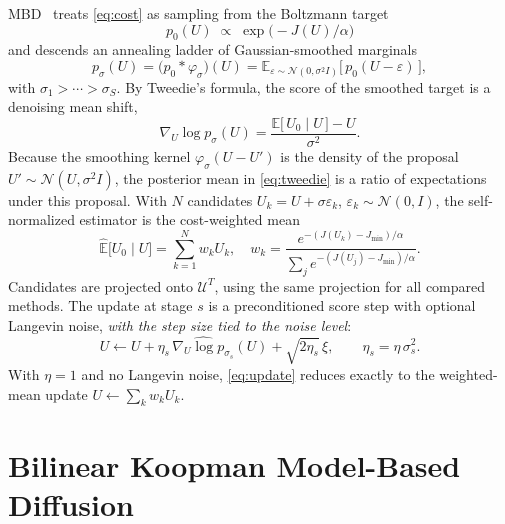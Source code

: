 \documentclass[letterpaper,10pt,conference]{ieeeconf}
\begin{document}
MBD~\cite{pan2024model} treats \eqref{eq:cost} as sampling from the Boltzmann target
\begin{equation}
p_0(U) \;\propto\; \exp\!\big(-J(U)/\alpha\big)
\label{eq:target}
\end{equation}
and descends an annealing ladder of Gaussian-smoothed marginals
\begin{equation}
p_{\sigma}(U) = \big(p_0 * \varphi_{\sigma}\big)(U)
= \mathbb{E}_{\varepsilon \sim \mathcal{N}(0, \sigma^{2} I)}
\big[\, p_0(U - \varepsilon) \,\big],
\label{eq:smooth}
\end{equation}
with $\sigma_1 > \cdots > \sigma_S$.
By Tweedie's formula, the score of the smoothed target is a denoising mean shift,
\begin{equation}
\nabla_U \log p_{\sigma}(U)
= \frac{\mathbb{E}\big[\,U_0 \mid U\,\big] - U}{\sigma^{2}} .
\label{eq:tweedie}
\end{equation}
Because the smoothing kernel $\varphi_\sigma(U-U')$ is the density of the proposal $U' \sim \mathcal{N}(U,\sigma^2 I)$, the posterior mean in \eqref{eq:tweedie} is a ratio of expectations under this proposal. With $N$ candidates $U_k=U+\sigma\varepsilon_k$, $\varepsilon_k\sim\mathcal{N}(0,I)$, the self-normalized estimator is the cost-weighted mean
\begin{equation}
\widehat{\mathbb{E}}\big[U_0 \mid U\big] = \sum_{k=1}^{N} w_k U_k,
\quad
w_k = \frac{e^{-(J(U_k) - J_{\min})/\alpha}}
           {\sum_{j} e^{-(J(U_j) - J_{\min})/\alpha}} .
\label{eq:weights}
\end{equation}
Candidates are projected onto $\mathcal{U}^{T}$, using the same projection for all compared methods.
The update at stage $s$ is a preconditioned score step with optional Langevin noise, \emph{with the step size tied to the noise level}:
\begin{equation}
U \leftarrow U + \eta_s\, \widehat{\nabla_U \log p_{\sigma_s}}(U)
+ \sqrt{2 \eta_s}\, \xi,
\qquad
\eta_s = \eta\, \sigma_s^{2} .
\label{eq:update}
\end{equation}
With $\eta = 1$ and no Langevin noise, \eqref{eq:update} reduces exactly to the weighted-mean update $U \leftarrow \sum_k w_k U_k$.

\section{Bilinear Koopman Model-Based Diffusion}\label{sec:method}
\end{document}

